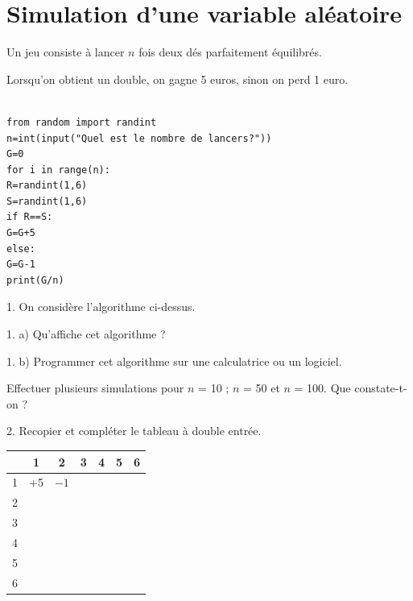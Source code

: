 \documentclass[11pt]{cornouaille}
\begin{document}
\newpage

\section{Simulation d'une variable aléatoire}

Un jeu consiste à lancer $n$ fois deux dés parfaitement équilibrés.

Lorsqu'on obtient un double, on gagne 5 euros, sinon on perd 1 euro.

\bigskip


\begin{verbatim}

from random import randint
n=int(input("Quel est le nombre de lancers?"))
G=0
for i in range(n):
R=randint(1,6)
S=randint(1,6)
if R==S:
G=G+5
else:
G=G-1
print(G/n)
\end{verbatim}


\bigskip





1.  On consid\`{e}re l'algorithme ci-dessus.




1. a)  Qu'affiche cet algorithme ?



1. b)  Programmer cet algorithme sur une calculatrice ou un
logiciel.

Effectuer plusieurs simulations pour $n$ = 10 ; $n$ = 50 et $n$ =
100. Que constate-t-on ?




2.  Recopier et compl\'{e}ter le tableau \`{a} double entr\'{e}e.




\begin{tabular}{|*7{c|}}
\hline
\rowcolor{FondTableaux}
{\cellcolor{white}}
& 1  & 2    & 3 & 4 & 5 & 6 \\       \hline
\cellcolor{FondTableaux}1 & +5 & $-1$ &   &   &   &   \\    \hline
\cellcolor{FondTableaux}2 &    &      &   &   &   &   \\     \hline
\cellcolor{FondTableaux}3 &    &      &   &   &   &   \\       \hline
\cellcolor{FondTableaux}4 &    &      &   &   &   &   \\       \hline
\cellcolor{FondTableaux}5 &    &      &   &   &   &   \\       \hline
\cellcolor{FondTableaux}6 &    &      &   &   &   &   \\       \hline
\end{tabular}
\end{document}
